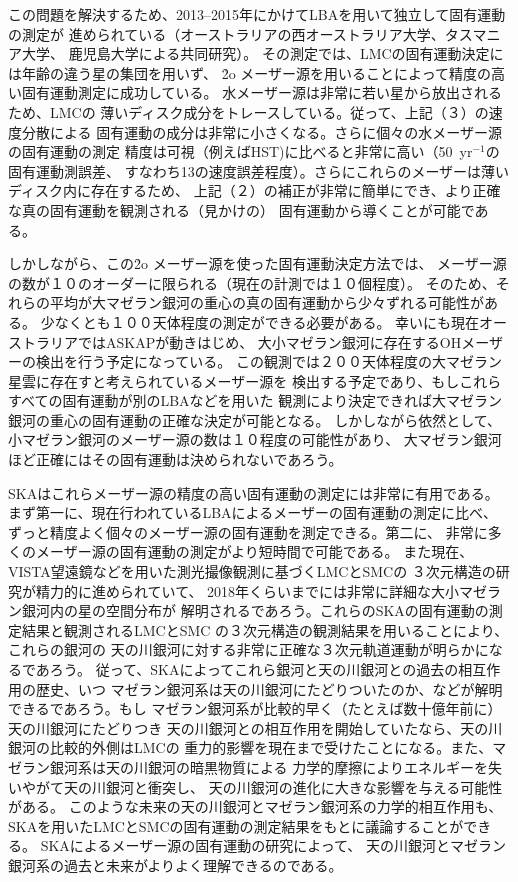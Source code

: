 この問題を解決するため、2013--2015年にかけてLBAを用いて独立して固有運動の測定が
進められている（オーストラリアの西オーストラリア大学、タスマニア大学、
鹿児島大学による共同研究）。
その測定では、LMCの固有運動決定には年齢の違う星の集団を用いず、
\h2o メーザー源を用いることによって精度の高い固有運動測定に成功している。
水メーザー源は非常に若い星から放出されるため、LMCの
薄いディスク成分をトレースしている。従って、上記（３）の速度分散による
固有運動の成分は非常に小さくなる。さらに個々の水メーザー源の固有運動の測定
精度は可視（例えばHST)に比べると非常に高い（50\uas ~yr$^{-1}$の固有運動測誤差、
すなわち13\kms の速度誤差程度）。さらにこれらのメーザーは薄いディスク内に存在するため、
上記（２）の補正が非常に簡単にでき、より正確な真の固有運動を観測される（見かけの）
固有運動から導くことが可能である。

しかしながら、この\h2o メーザー源を使った固有運動決定方法では、
メーザー源の数が１０のオーダーに限られる（現在の計測では１０個程度）。
そのため、それらの平均が大マゼラン銀河の重心の真の固有運動から少々ずれる可能性がある。
少なくとも１００天体程度の測定ができる必要がある。
幸いにも現在オーストラリアではASKAPが動きはじめ、
大小マゼラン銀河に存在するOHメーザーの検出を行う予定になっている。
この観測では２００天体程度の大マゼラン星雲に存在すと考えられているメーザー源を
検出する予定であり、もしこれらすべての固有運動が別のLBAなどを用いた
観測により決定できれば大マゼラン銀河の重心の固有運動の正確な決定が可能となる。
しかしながら依然として、小マゼラン銀河のメーザー源の数は１０程度の可能性があり、
大マゼラン銀河ほど正確にはその固有運動は決められないであろう。

SKAはこれらメーザー源の精度の高い固有運動の測定には非常に有用である。
まず第一に、現在行われているLBAによるメーザーの固有運動の測定に比べ、
ずっと精度よく個々のメーザー源の固有運動を測定できる。第二に、
非常に多くのメーザー源の固有運動の測定がより短時間で可能である。
また現在、VISTA望遠鏡などを用いた測光撮像観測に基づくLMCとSMCの
３次元構造の研究が精力的に進められていて、
2018年くらいまでには非常に詳細な大小マゼラン銀河内の星の空間分布が
解明されるであろう。これらのSKAの固有運動の測定結果と観測されるLMCとSMC
の３次元構造の観測結果を用いることにより、これらの銀河の
天の川銀河に対する非常に正確な３次元軌道運動が明らかになるであろう。
従って、SKAによってこれら銀河と天の川銀河との過去の相互作用の歴史、いつ
マゼラン銀河系は天の川銀河にたどりついたのか、などが解明できるであろう。もし
マゼラン銀河系が比較的早く（たとえば数十億年前に）天の川銀河にたどりつき
天の川銀河との相互作用を開始していたなら、天の川銀河の比較的外側はLMCの
重力的影響を現在まで受けたことになる。また、マゼラン銀河系は天の川銀河の暗黒物質による
力学的摩擦によりエネルギーを失いやがて天の川銀河と衝突し、
天の川銀河の進化に大きな影響を与える可能性がある。
このような未来の天の川銀河とマゼラン銀河系の力学的相互作用も、
SKAを用いたLMCとSMCの固有運動の測定結果をもとに議論することができる。
SKAによるメーザー源の固有運動の研究によって、
天の川銀河とマゼラン銀河系の過去と未来がよりよく理解できるのである。


